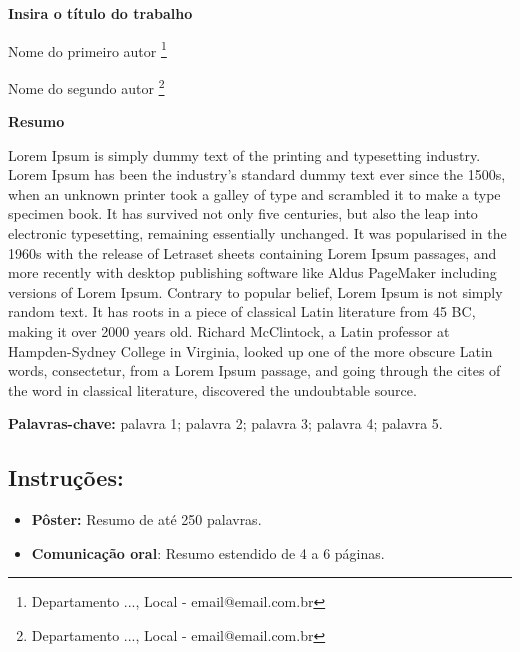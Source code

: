 \documentclass[a4paper,11pt]{article}
\begin{document}
\begin{center}
\Large{\textbf{Insira o título do trabalho}}
\end{center}

\begin{center}
    Nome do primeiro autor
    \footnote[1]{Departamento ..., Local - email@email.com.br}

    Nome do segundo autor
    \footnote[2]{Departamento ..., Local - email@email.com.br}

    \vspace{0.5cm}
    \large{\textbf{Resumo}}
\end{center}

Lorem Ipsum is simply dummy text of the printing and typesetting industry. Lorem Ipsum has been the industry's standard dummy text ever since the 1500s, when an unknown printer took a galley of type and scrambled it to make a type specimen book. It has survived not only five centuries, but also the leap into electronic typesetting, remaining essentially unchanged. It was popularised in the 1960s with the release of Letraset sheets containing Lorem Ipsum passages, and more recently with desktop publishing software like Aldus PageMaker including versions of Lorem Ipsum. Contrary to popular belief, Lorem Ipsum is not simply random text. It has roots in a piece of classical Latin literature from 45 BC, making it over 2000 years old. Richard McClintock, a Latin professor at Hampden-Sydney College in Virginia, looked up one of the more obscure Latin words, consectetur, from a Lorem Ipsum passage, and going through the cites of the word in classical literature, discovered the undoubtable source.

\vspace{0.5cm}
\textbf{Palavras-chave:} palavra 1; palavra 2; palavra 3; palavra 4; palavra 5.
\vskip1cm
\subsection*{Instruções:}
\begin{itemize}
\item[]\textbf{Pôster:} Resumo de até 250 palavras. 
\item[] \textbf{Comunicação oral}: Resumo estendido de 4 a 6 páginas.
\end{itemize}

%
%
\end{document}
